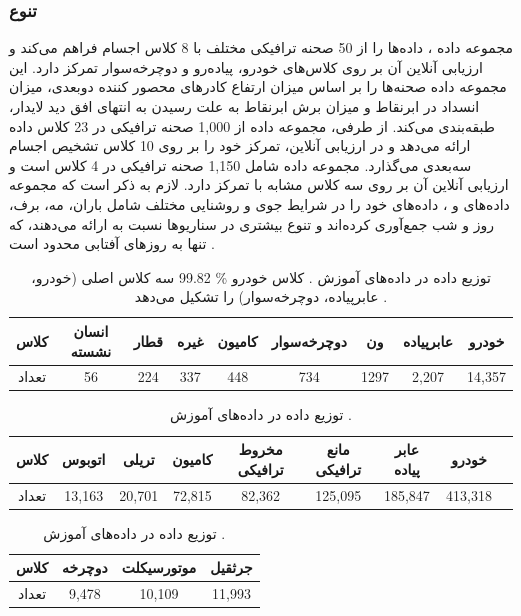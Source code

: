 \subsubsection{تنوع}

مجموعه داده ، داده‌ها را از 50 صحنه ترافیکی مختلف با 8 کلاس اجسام فراهم می‌کند و ارزیابی آنلاین آن بر روی کلاس‌های خودرو، پیاده‌رو و دوچرخه‌سوار تمرکز دارد. این مجموعه داده صحنه‌ها را بر اساس میزان ارتفاع کادر‌های محصور کننده دوبعدی، میزان انسداد در ابرنقاط و میزان برش ابرنقاط به علت رسیدن به انتهای افق دید لایدار، طبقه‌بندی می‌کند. از طرفی، مجموعه داده  از 1,000 صحنه ترافیکی در 23 کلاس داده ارائه می‌دهد و در ارزیابی آنلاین، تمرکز خود را بر روی 10 کلاس تشخیص اجسام سه‌بعدی می‌گذارد. مجموعه داده  شامل 1,150 صحنه ترافیکی در 4 کلاس است و ارزیابی آنلاین آن بر روی سه کلاس مشابه با  تمرکز دارد. لازم به ذکر است که مجموعه داده‌های  و ، داده‌های خود را در شرایط جوی و روشنایی مختلف شامل باران، مه، برف، روز و شب جمع‌آوری کرده‌اند و تنوع بیشتری در سناریوها نسبت به  ارائه می‌دهند، که تنها به روزهای آفتابی محدود است \cite{qian20223d}.

\begin{table}[h!]
    \centering
    \caption{توزیع داده در داده‌های آموزش . کلاس خودرو \% 99.82 سه کلاس اصلی (خودرو، عابرپیاده، دوچرخه‌سوار) را تشکیل می‌دهد \cite{qian20223d}.}
    \begin{tabular}{ccccccccc}
         \hline
         کلاس & انسان نشسته & قطار & غیره & کامیون & دوچرخه‌سوار & ون & عابر‌پیاده & خودرو  \\
         \hline
          تعداد & 56 & 224 & 337 & 448 & 734 & 1297 & 2,207 & 14,357 \\
         \hline
    \end{tabular}
    \label{tab:KITTI_class_table}
\end{table}

\begin{table}[h!]
    \centering
    \caption{توزیع داده در داده‌های آموزش  \cite{qian20223d}.}
    \label{tab:nuSceness_class_table}
    \begin{tabular}{ccccccccc}
         \hline
         کلاس & اتوبوس & تریلی & کامیون & مخروط ترافیکی & مانع ترافیکی & عابر پیاده & خودرو\\
         \hline
         تعداد & 13,163 & 20,701 & 72,815 & 82,362 & 125,095 & 185,847 & 413,318 \\
         \hline
    \end{tabular}
    
    \begin{tabular}{cccc}
        \\
        \hline
        کلاس‌ & دوچرخه & موتورسیکلت & جرثقیل \\
        \hline
         تعداد & 9,478 & 10,109 & 11,993 \\
        \hline
    \end{tabular}
\end{table}

